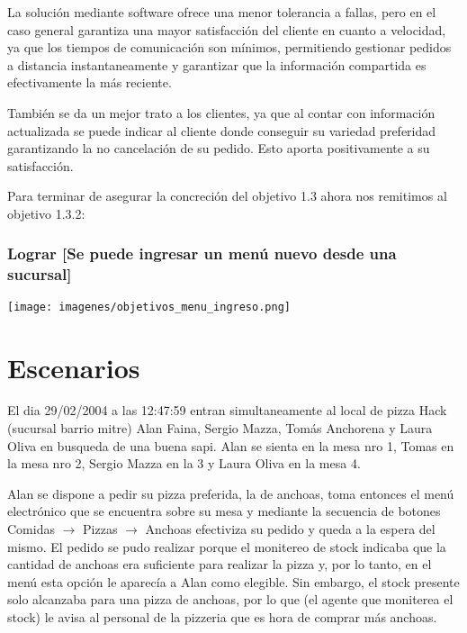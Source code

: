 \documentclass[a4paper,10pt]{article}
\begin{document}
La solución mediante software ofrece una menor tolerancia a fallas, pero en el caso general garantiza una mayor satisfacción del cliente en cuanto a velocidad, ya que los tiempos de comunicación son mínimos, permitiendo gestionar pedidos a distancia instantaneamente y garantizar que la información compartida es efectivamente la más reciente.

También se da un mejor trato a los clientes, ya que al contar con información actualizada se puede indicar al cliente donde conseguir su variedad preferidad garantizando la no cancelación de su pedido. Esto aporta positivamente a su satisfacción.



Para terminar de asegurar la concreción del objetivo 1.3 ahora nos remitimos al objetivo 1.3.2:
\subsubsection*{Lograr [Se puede ingresar un menú nuevo desde una sucursal]}

\texttt{[image: imagenes/objetivos\_menu\_ingreso.png]}

\newpage
\section*{Escenarios}
El dia 29/02/2004 a las 12:47:59 entran simultaneamente al local de pizza Hack (sucursal barrio mitre) Alan Faina, 
Sergio Mazza, Tom\'as Anchorena y Laura Oliva en busqueda de una buena sapi. 
Alan se sienta en la mesa nro 1, Tomas en la mesa nro 2, Sergio Mazza en la 3 y Laura Oliva en la mesa 4. 

Alan se dispone a pedir su pizza preferida, la de anchoas, toma entonces el men\'u electr\'onico que se encuentra sobre su mesa y
mediante la secuencia de botones Comidas $\rightarrow$ Pizzas $\rightarrow$ Anchoas efectiviza su pedido y queda a la espera del mismo. El pedido se pudo 
realizar porque el monitereo de stock indicaba que la cantidad de anchoas era suficiente para realizar la pizza y, por lo tanto, en el men\'u
esta opci\'on le aparec\'ia a Alan como elegible. Sin embargo, el stock presente solo alcanzaba para una pizza de anchoas, por lo que (el agente
que moniterea el stock) le avisa al personal de la pizzeria que es hora de comprar m\'as anchoas.
\end{document}
